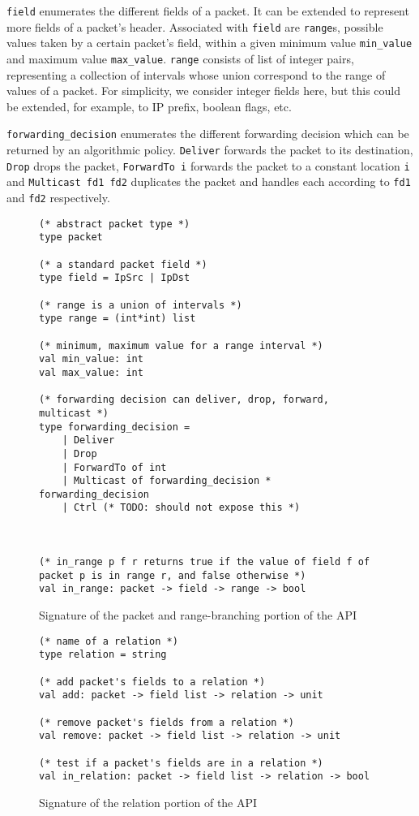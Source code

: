 \documentclass[11pt]{article}
\begin{document}
\lstinline|field| enumerates the different fields of a packet. It can be extended to represent more fields of a packet's header. Associated with \lstinline|field| are \lstinline|range|s, possible values taken by a certain packet's field, within a given minimum value \lstinline|min_value| and maximum value \lstinline|max_value|. \lstinline|range| consists of list of integer pairs, representing a collection of intervals whose union correspond to the range of values of a packet. For simplicity, we consider integer fields here, but this could be extended, for example, to IP prefix, boolean flags, etc.

\lstinline|forwarding_decision| enumerates the different forwarding decision which can be returned by an algorithmic policy. \lstinline|Deliver| forwards the packet to its destination, \lstinline|Drop| drops the packet, \lstinline|ForwardTo i| forwards the packet to a constant location \lstinline|i| and \lstinline|Multicast fd1 fd2| duplicates the packet and handles each according to \lstinline|fd1| and \lstinline|fd2| respectively.


\begin{figure}
  \begin{lstlisting}
(* abstract packet type *)
type packet

(* a standard packet field *)
type field = IpSrc | IpDst 

(* range is a union of intervals *)
type range = (int*int) list

(* minimum, maximum value for a range interval *)
val min_value: int 
val max_value: int

(* forwarding decision can deliver, drop, forward, multicast *)
type forwarding_decision =
	| Deliver
	| Drop
	| ForwardTo of int
	| Multicast of forwarding_decision * forwarding_decision
	| Ctrl (* TODO: should not expose this *)



(* in_range p f r returns true if the value of field f of packet p is in range r, and false otherwise *)
val in_range: packet -> field -> range -> bool
\end{lstlisting}
\label{fig:range_api}
\caption{Signature of the packet and range-branching portion of the API}
\end{figure}


\begin{figure}
  \begin{lstlisting}
(* name of a relation *)
type relation = string

(* add packet's fields to a relation *)
val add: packet -> field list -> relation -> unit

(* remove packet's fields from a relation *)
val remove: packet -> field list -> relation -> unit

(* test if a packet's fields are in a relation *)
val in_relation: packet -> field list -> relation -> bool
\end{lstlisting}
\label{fig:rel_api}
\caption{Signature of the relation portion of the API}
\end{figure}
\end{document}
